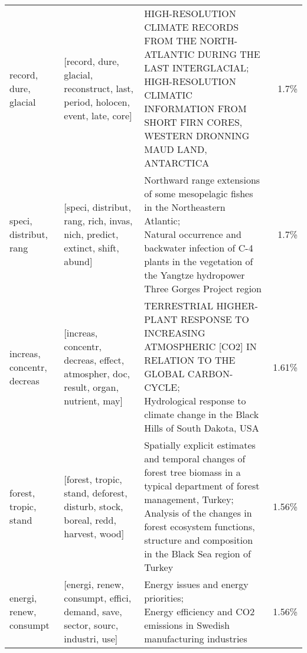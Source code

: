 \begin{tabular}{p{1.9cm} p{3cm} p{7.5cm} r}
      record, dure, glacial &       [record, dure, glacial, reconstruct, last, period, holocen, event, late, core] &                                                           \parbox[t]{7.5cm}{HIGH-RESOLUTION CLIMATE RECORDS FROM THE NORTH-ATLANTIC DURING THE LAST INTERGLACIAL; \\HIGH-RESOLUTION CLIMATIC INFORMATION FROM SHORT FIRN CORES, WESTERN DRONNING MAUD LAND, ANTARCTICA} &   1.7\% \\
     speci, distribut, rang &          [speci, distribut, rang, rich, invas, nich, predict, extinct, shift, abund] &                               \parbox[t]{7.5cm}{Northward range extensions of some mesopelagic fishes in the Northeastern Atlantic; \\Natural occurrence and backwater infection of C-4 plants in the vegetation of the Yangtze hydropower Three Gorges Project region} &   1.7\% \\
 increas, concentr, decreas &   [increas, concentr, decreas, effect, atmospher, doc, result, organ, nutrient, may] &                                                          \parbox[t]{7.5cm}{TERRESTRIAL HIGHER-PLANT RESPONSE TO INCREASING ATMOSPHERIC [CO2] IN RELATION TO THE GLOBAL CARBON-CYCLE; \\Hydrological response to climate change in the Black Hills of South Dakota, USA} &  1.61\% \\
      forest, tropic, stand &       [forest, tropic, stand, deforest, disturb, stock, boreal, redd, harvest, wood] &  \parbox[t]{7.5cm}{Spatially explicit estimates and temporal changes of forest tree biomass in a typical department of forest management, Turkey; \\Analysis of the changes in forest ecosystem functions, structure and composition in the Black Sea region of Turkey} &  1.56\% \\
    energi, renew, consumpt &        [energi, renew, consumpt, effici, demand, save, sector, sourc, industri, use] &                                                                                                                                       \parbox[t]{7.5cm}{Energy issues and energy priorities; \\Energy efficiency and CO2 emissions in Swedish manufacturing industries} &  1.56\% \\
\bottomrule
\end{tabular}
